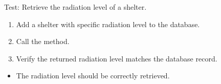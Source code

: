 \documentclass[letterpaper,10pt,english]{sphinxmanual}
\begin{document}
\begin{fulllineitems}
\label{\detokenize{test:test.test_shelter.test_get_shelter_radiation_level_success}}
\pysigstartsignatures
\pysiglinewithargsret
{}
{}
{}
\pysigstopsignatures
\sphinxAtStartPar
Test: Retrieve the radiation level of a shelter.
\begin{description}
\begin{enumerate}
%
\item {} 
\sphinxAtStartPar
Add a shelter with specific radiation level to the database.

\item {} 
\sphinxAtStartPar
Call the  method.

\item {} 
\sphinxAtStartPar
Verify the returned radiation level matches the database record.

\end{enumerate}

\begin{itemize}
\item {} 
\sphinxAtStartPar
The radiation level should be correctly retrieved.

\end{itemize}

\end{description}

\end{fulllineitems}

\end{document}
